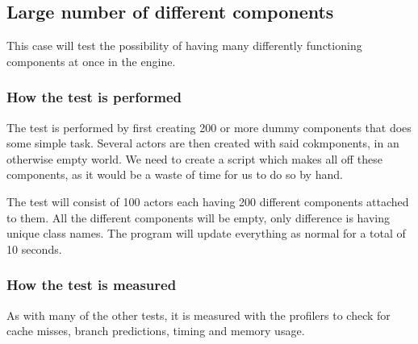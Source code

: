 \subsection{Large number of different components}
This case will test the possibility of having many differently functioning components at once in the engine. 

\subsubsection*{How the test is performed}
The test is performed by first creating 200 or more dummy components that does some simple task. 
Several actors are then created with said cokmponents, in an otherwise empty world.
We need to create a script which makes all off these components, as it would be a waste of time for us to do so by hand.

The test will consist of 100 actors each having 200 different components attached to them.
All the different components will be empty, only difference is having unique class names.
The program will update everything as normal for a total of 10 seconds.

\subsubsection*{How the test is measured}
As with many of the other tests, it is measured with the profilers to check for cache misses, branch predictions, timing and memory usage.
